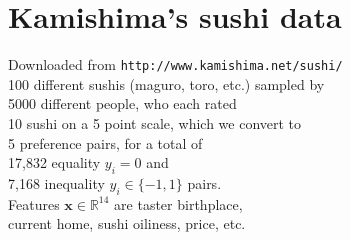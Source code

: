 \documentclass{article}
\newcommand{\RR}{\mathbb R}
\begin{document}
\begin{minipage}{7in}
  \section*{Kamishima's sushi data}
Downloaded from \texttt{http://www.kamishima.net/sushi/}\\
  100 different sushis (maguro, toro, etc.) sampled by\\
  5000 different people, who each rated\\
  10 sushi on a 5 point scale, which we convert to\\
  5 preference pairs, for a total of\\
  17,832 equality $y_i=0$ and \\
  7,168 inequality $y_i\in\{-1,1\}$ pairs.\\
  Features $\mathbf x\in\RR^{14}$ are taster birthplace,\\
  current home, sushi oiliness, price, etc.

  
\end{minipage}
\end{document}
